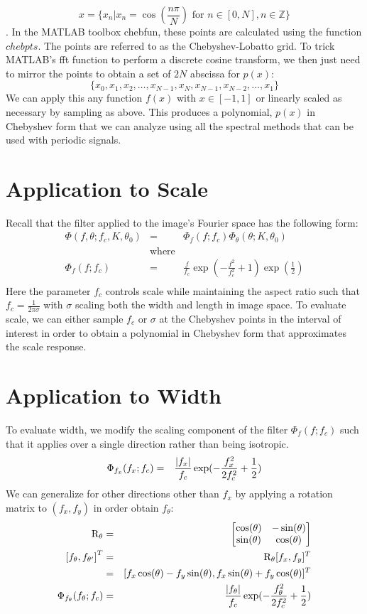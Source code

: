 \documentclass{article}
\DeclarePairedDelimiter\abs{\lvert}{\rvert}%
\begin{document}
\[ x = \{ x_n | x_n = \cos(\frac{n\pi}{N}) \mbox{ for } n \in [0,N], n \in \mathbb{Z} \} \].
In the MATLAB toolbox chebfun, these points are calculated using the function $ chebpts $. The points are referred to as the Chebyshev-Lobatto grid. To trick MATLAB's fft function to perform a discrete cosine transform, we then just need to mirror the points to obtain a set of $ 2N $ abscissa for $ p(x) $:
\[ \{x_0, x_1, x_2, \hdots, x_{N-1}, x_N, x_{N-1}, x_{N-2}, \hdots, x_1\} \]
We can apply this any function $ f(x) $ with $ x \in [-1,1] $ or linearly scaled as necessary by sampling as above. This produces a polynomial, $ p(x) $ in Chebyshev form that we can analyze using all the spectral methods that can be used with periodic signals.
\section{Application to Scale}
Recall that the filter applied to the image's Fourier space has the following form:
\begin{eqnarray}
    \Phi(f,\theta; f_c, K, \theta_0) & = & \Phi_f(f; f_c) \Phi_\theta(\theta; K, \theta_0) \\
    & \mbox{where} & \nonumber \\
    \Phi_f(f; f_c) & = & \frac{f}{f_c} \exp(-\frac{f^2}{f_c^2}+1) \exp(\frac{1}{2}) \\
\end{eqnarray}
Here the parameter $ f_c $ controls scale while maintaining the aspect ratio such that $ f_c = \frac{1}{2\pi \sigma} $ with $ \sigma $ scaling both the width and length in image space. To evaluate scale, we can either sample $ f_c $ or $ \sigma $ at the Chebyshev points in the interval of interest in order to obtain a polynomial in Chebyshev form that approximates the scale response.
\section{Application to Width}
To evaluate width, we modify the scaling component of the filter $ \Phi_f(f; f_c) $ such that it applies over a single direction rather than being isotropic.
\begin{eqnarray}
	\Phi_{f_x}(f_x; f_c) & = & \frac{\abs {f_x}}{f_c} \exp(-\frac{f_x^2}{2f_c^2}+\frac{1}{2})
\end{eqnarray}
We can generalize for other directions other than $ f_x $ by applying a rotation matrix to $ (f_x,f_y) $ in order obtain $ f_\theta $:
\begin{eqnarray}
    \mathrm{R}_\theta & = &
    \begin{bmatrix}
        \cos(\theta) & -\sin(\theta) \\
        \sin(\theta) & \cos(\theta)
    \end{bmatrix} \\
   \left[f_{\theta},f_{\theta'}\right]^T  & = & \mathrm{R}_\theta [f_x,f_y]^T \\
    & = & [ f_x\cos(\theta)  -f_y \sin(\theta) , f_x \sin(\theta) + f_y \cos(\theta) ]^T  \\
    \Phi_{f_\theta}(f_\theta; f_c) & = & \frac{\abs {f_\theta}}{f_c} \exp(-\frac{f_\theta^2}{2f_c^2}+\frac{1}{2}) 
\end{eqnarray}
\end{document}

